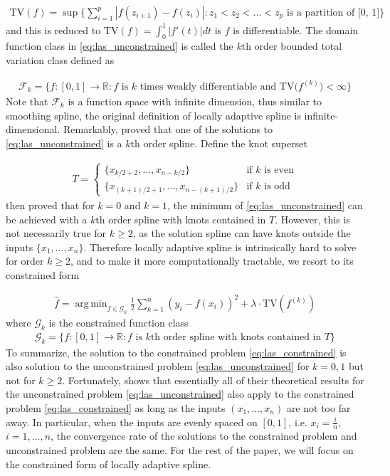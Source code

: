 \documentclass[a4paper]{article}
\DeclareMathOperator*{\argmin}{arg\,min}
\newcommand{\RR}{\mathbb{R}}
\renewcommand{\cal}{\mathcal}
\begin{document}
\begin{align*}
\text{TV}(f) = \sup\{\sum_{i=1}^p |f(z_{i+1}) - f(z_i)|:z_1<z_2<\ldots<z_p \text{ is a partition of [0, 1]}\}
\end{align*}
and this is reduced to $\text{TV}(f) = \int_0^1|f'(t)|dt$ is $f$ is differentiable. The domain function class in \eqref{eq:las_unconstrained} is called the $k$th order bounded total variation class defined as 

\begin{align*}
\cal{F}_k = \{f:[0, 1]\rightarrow\RR: f \text{ is $k$ times weakly differentiable and TV($f^{(k)}$)$<\infty$}\}
\end{align*}
Note that $\cal{F}_k$ is a function space with infinite dimension, thus similar to smoothing spline, the original definition of locally adaptive spline is infinite-dimensional. Remarkably, \cite{mammen1997locally} proved that one of the solutions to \eqref{eq:las_unconstrained} is a $k$th order spline. Define the knot superset

\begin{align}
T = 
\begin{cases}
\{x_{k/2+2}, \ldots, x_{n-k/2}\} & \text{if $k$ is even}\\
\{x_{(k+1)/2+1}, \ldots, x_{n-(k+1)/2}\} & \text{if $k$ is odd}
\end{cases}
\label{eq:knotT}
\end{align}
then \cite{mammen1997locally} proved that for $k = 0$ and $k = 1$, the minimum of \eqref{eq:las_unconstrained} can be achieved with a $k$th order spline with knots contained in $T$. However, this is not necessarily true for $k\geq 2$, as the solution spline can have knots outside the inputs $\{x_1,\ldots, x_n\}$. Therefore locally adaptive spline is intrinsically hard to solve for order $k\geq 2$, and to make it more computationally tractable, we resort to its constrained form

\begin{align}
\hat{f} = \argmin_{f\in\cal{G}_k} \frac{1}{2}\sum_{k=1}^n (y_i - f(x_i))^2 + \lambda\cdot\text{TV}(f^{(k)})
\label{eq:las_constrained}
\end{align}
where $\cal{G}_k$ is the constrained function class
\begin{align*}
\cal{G}_k = \{f:[0, 1]\rightarrow\RR:\text{$f$ is $k$th order spline with knots contained in $T$}\}
\end{align*}
To summarize, the solution to the constrained problem  \eqref{eq:las_constrained} is also solution to the unconstrained problem \eqref{eq:las_unconstrained} for $k = 0, 1$ but not for $k\geq 2$. Fortunately, \cite{mammen1997locally} shows that essentially all of their theoretical results for the unconstrained problem \eqref{eq:las_unconstrained} also apply to the constrained problem \eqref{eq:las_constrained} as long as the inputs $(x_1,\ldots, x_n)$ are not too far away. In particular, when the inputs are evenly spaced on $[0, 1]$, i.e. $x_i=\frac{i}{n}$, $i=1,\ldots, n$, the convergence rate of the solutions to the constrained problem and unconstrained problem are the same. For the rest of the paper, we will focus on the constrained form of locally adaptive spline. 
\end{document}
